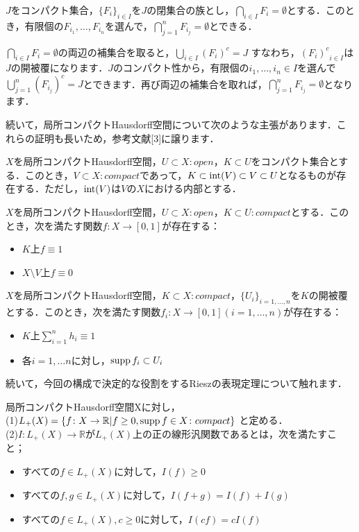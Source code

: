 \begin{ylem}\label{4}
$J$をコンパクト集合，$\{ F_i \}_{i \in I}$を$J$の閉集合の族とし，$\bigcap_{i \in I}F_i = \emptyset$とする．このとき，有限個の$F_{i_1}, \ldots , F_{i_n}$を選んで，$\bigcap_{j=1}^{n}F_{i_j} = \emptyset$とできる．
\end{ylem}
\begin{Proof}
$\bigcap_{i \in I}F_i = \emptyset$の両辺の補集合を取ると，$\bigcup_{i \in I}(F_i)^{c} = J$ すなわち，${(F_i)^{c}}_{i \in I}$は$J$の開被覆になります．$J$のコンパクト性から，有限個の$i_1, \ldots , i_n \in I$を選んで$\bigcup_{j=1}^{n}(F_{i_j})^{c} = J$とできます．再び両辺の補集合を取れば，$\bigcap_{j=1}^{n}F_{i_j} = \emptyset$となります．
\end{Proof}
続いて，局所コンパクトHausdorff空間について次のような主張があります．これらの証明も長いため，参考文献[3]に譲ります．
\begin{ythm}\label{5}
$X$を局所コンパクトHausdorff空間，$U \subset X \colon open$，$K \subset U$をコンパクト集合とする．このとき，$V \subset X :compact$であって，$K \subset \operatorname{int}(V) \subset V \subset U$となるものが存在する．ただし，$\operatorname{int}(V)$は$V$の$X$における内部とする．
\end{ythm}
\begin{ythm}[Urysohnの補題]\label{6}
$X$を局所コンパクトHausdorff空間，$U \subset X \colon open$，$K \subset U \colon compact$とする．このとき，次を満たす関数$f \colon X \to [0, 1]$が存在する：
\begin{itemize}
 \item $K$上$f \equiv 1$
 \item $X \setminus V$上$f \equiv 0$
\end{itemize}
\end{ythm}
\begin{ythm}[1の分割]\label{7}
$X$を局所コンパクトHausdorff空間，$K \subset X \colon compact$，$\{ U_i \}_{i=1, \ldots , n}$を$K$の開被覆とする．このとき，次を満たす関数$f_i \colon X \to [0,1] (i=1, \ldots , n)$が存在する：
\begin{itemize}
 \item $K$上$\sum_{i=1}^{n}h_i \equiv 1$
 \item 各$i=1, \ldots n$に対し，$\operatorname{supp} f_i \subset U_i$
\end{itemize}
\end{ythm}
続いて，今回の構成で決定的な役割をするRieszの表現定理について触れます．
\begin{ydefi}\label{8}
局所コンパクトHausdorff空間Xに対し， \\
 (1)$L_{+}(X)= \{ f \colon X \to \mathbb{R} | f \ge 0, \operatorname{supp} f \in X \colon compact\}$ と定める． \\
 (2)$I \colon L_{+}(X) \to \mathbb{R}$が$L_{+}(X)$上の正の線形汎関数であるとは，次を満たすこと；
\begin{itemize}
 \item すべての$f \in L_{+}(X)$に対して，$I(f) \ge 0$
 \item すべての$f,g \in L_{+}(X)$に対して，$I(f+g)=I(f)+I(g)$
 \item すべての$f \in L_{+}(X), c \ge 0$に対して，$I(cf)=cI(f)$
\end{itemize}
\end{ydefi}
